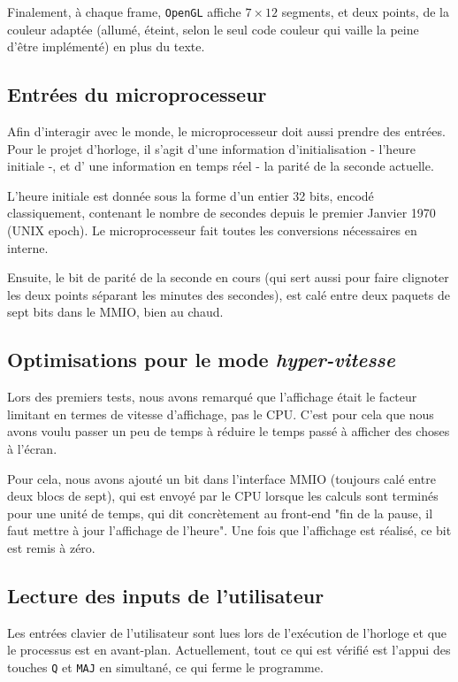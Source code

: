\documentclass[10pt,a4paper,notitlepage ]{report}
\begin{document}
	Finalement, à chaque frame, \texttt{OpenGL} affiche $7\times 12$ segments, et deux points, de la couleur adaptée (allumé, éteint, selon le seul code couleur qui vaille la peine d'être implémenté) en plus du texte.
	
	\subsection{Entrées du microprocesseur}
	
	Afin d'interagir avec le monde, le microprocesseur doit aussi prendre des entrées. Pour le projet d'horloge, il s'agit d'une information d'initialisation - l'heure initiale -, et d' une information en temps réel - la parité de la seconde actuelle.
	
	L'heure initiale est donnée sous la forme d'un entier 32 bits, encodé classiquement, contenant le nombre de secondes depuis le premier Janvier 1970 (UNIX epoch). Le microprocesseur fait toutes les conversions nécessaires en interne.
	
	Ensuite, le bit de parité de la seconde en cours (qui sert aussi pour faire clignoter les deux points séparant les minutes des secondes), est calé entre deux paquets de sept bits dans le MMIO, bien au chaud.
	
	\subsection{Optimisations pour le mode \textit{hyper-vitesse}}
	
	Lors des premiers tests, nous avons remarqué que l'affichage était le facteur limitant en termes de vitesse d'affichage, pas le CPU. C'est pour cela que nous avons voulu passer un peu de temps à réduire le temps passé à afficher des choses à l'écran.
	
	Pour cela, nous avons ajouté un bit dans l'interface MMIO (toujours calé entre deux blocs de sept), qui est envoyé par le CPU lorsque les calculs sont terminés pour une unité de temps, qui dit concrètement au front-end "fin de la pause, il faut mettre à jour l'affichage de l'heure". Une fois que l'affichage est réalisé, ce bit est remis à zéro.
	
	\subsection{Lecture des inputs de l'utilisateur}
	
	Les entrées clavier de l'utilisateur sont lues lors de l'exécution de l'horloge et que le processus est en avant-plan. Actuellement, tout ce qui est vérifié est l'appui des touches \texttt{Q} et \texttt{MAJ} en simultané, ce qui ferme le programme.
	
\end{document}
